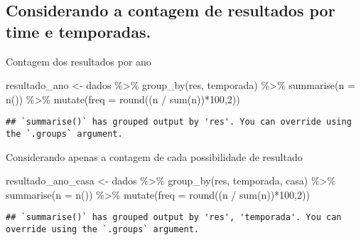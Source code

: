 \documentclass[
]{article}
\newenvironment{Shaded}{\begin{snugshade}}{\end{snugshade}}
\newcommand{\AttributeTok}[1]{\textcolor[rgb]{0.77,0.63,0.00}{#1}}
\newcommand{\DecValTok}[1]{\textcolor[rgb]{0.00,0.00,0.81}{#1}}
\newcommand{\FunctionTok}[1]{\textcolor[rgb]{0.00,0.00,0.00}{#1}}
\newcommand{\NormalTok}[1]{#1}
\newcommand{\OtherTok}[1]{\textcolor[rgb]{0.56,0.35,0.01}{#1}}
\newcommand{\SpecialCharTok}[1]{\textcolor[rgb]{0.00,0.00,0.00}{#1}}
\begin{document}
\hypertarget{considerando-a-contagem-de-resultados-por-time-e-temporadas.}{%
\subsection{Considerando a contagem de resultados por time e
temporadas.}\label{considerando-a-contagem-de-resultados-por-time-e-temporadas.}}

Contagem dos resultados por ano

\begin{Shaded}
\begin{Highlighting}[]
\NormalTok{resultado\_ano }\OtherTok{\textless{}{-}}\NormalTok{ dados }\SpecialCharTok{\%\textgreater{}\%} \FunctionTok{group\_by}\NormalTok{(res, temporada) }\SpecialCharTok{\%\textgreater{}\%}  
  \FunctionTok{summarise}\NormalTok{(}\AttributeTok{n =} \FunctionTok{n}\NormalTok{()) }\SpecialCharTok{\%\textgreater{}\%} \FunctionTok{mutate}\NormalTok{(}\AttributeTok{freq =} \FunctionTok{round}\NormalTok{((n }\SpecialCharTok{/} \FunctionTok{sum}\NormalTok{(n))}\SpecialCharTok{*}\DecValTok{100}\NormalTok{,}\DecValTok{2}\NormalTok{))}
\end{Highlighting}
\end{Shaded}

\begin{verbatim}
## `summarise()` has grouped output by 'res'. You can override using the `.groups` argument.
\end{verbatim}

Considerando apenas a contagem de cada possibilidade de resultado

\begin{Shaded}
\begin{Highlighting}[]
\NormalTok{resultado\_ano\_casa }\OtherTok{\textless{}{-}}\NormalTok{ dados }\SpecialCharTok{\%\textgreater{}\%} \FunctionTok{group\_by}\NormalTok{(res, temporada, casa) }\SpecialCharTok{\%\textgreater{}\%} 
  \FunctionTok{summarise}\NormalTok{(}\AttributeTok{n =} \FunctionTok{n}\NormalTok{()) }\SpecialCharTok{\%\textgreater{}\%} \FunctionTok{mutate}\NormalTok{(}\AttributeTok{freq =} \FunctionTok{round}\NormalTok{((n }\SpecialCharTok{/} \FunctionTok{sum}\NormalTok{(n))}\SpecialCharTok{*}\DecValTok{100}\NormalTok{,}\DecValTok{2}\NormalTok{))}
\end{Highlighting}
\end{Shaded}

\begin{verbatim}
## `summarise()` has grouped output by 'res', 'temporada'. You can override using the `.groups` argument.
\end{verbatim}
\end{document}
